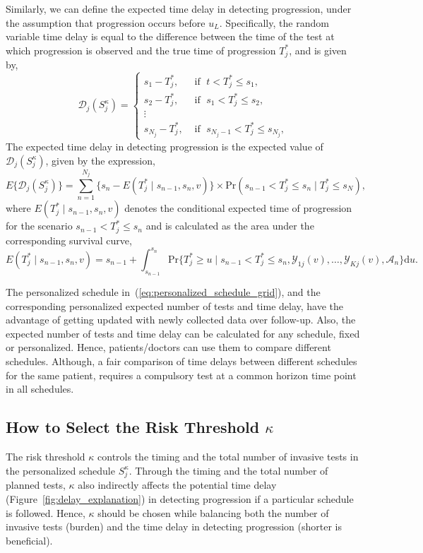 Similarly, we can define the expected time delay in detecting progression, under the assumption that progression occurs before $u_L$. Specifically, the random variable time delay is equal to the difference between the time of the test at which progression is observed and the true time of progression $T_j^*$, and is given by,
\[
\mathcal D_j (S^\kappa_j) = \left \{
\begin{array}{ll}
s_1 - T_j^*, & \mbox{ if } \; t < T^*_j \leq s_1,\\
s_2 - T_j^*, & \mbox{ if } \; s_1 < T^*_j \leq s_2,\\
\vdots&\\
s_{N_j} - T_j^*, & \mbox{ if } \; s_{N_j-1} < T^*_j \leq s_{N_j},
\end{array}
\right.
\]
The expected time delay in detecting progression is the expected value of $\mathcal D_j (S^\kappa_j)$, given by the expression,
\begin{equation*}
\label{eq:exp_delay}
E \big \{ \mathcal D_j(S^\kappa_j)\big\} = \sum_{n = 1}^{N_j} \Big\{s_n - E(T^*_j \mid s_{n-1}, s_n, v)\Big\} \times \mbox{Pr}(s_{n-1} < T^*_j \leq s_n\mid T^*_j \leq s_N),
\end{equation*}
where $E(T^*_j \mid s_{n-1}, s_n, v)$ denotes the conditional expected time of progression for the scenario $s_{n-1} < T^*_j \leq s_n$ and is calculated as the area under the corresponding survival curve,
\begin{equation*}
E(T^*_j \mid s_{n-1}, s_n, v) = s_{n-1} + \int_{s_{n-1}}^{s_n} \mbox{Pr}\Big\{T^*_j \geq u \mid s_{n-1} < T^*_j \leq s_n, \mathcal{Y}_{1j}(v), \ldots, \mathcal{Y}_{Kj}(v), \mathcal{A}_n\Big\} \mathrm{d}u.
\end{equation*}

The personalized schedule in~(\ref{eq:personalized_schedule_grid}), and the corresponding personalized expected number of tests and time delay, have the advantage of getting updated with newly collected data over follow-up. Also, the expected number of tests and time delay can be calculated for any schedule, fixed or personalized. Hence, patients/doctors can use them to compare different schedules. Although, a fair comparison of time delays between different schedules for the same patient, requires a compulsory test at a common horizon time point in all schedules.

\subsection{How to Select the Risk Threshold $\kappa$}
\label{subsec:kappa_selection}
The risk threshold $\kappa$ controls the timing and the total number of invasive tests in the personalized schedule $S^\kappa_j$. Through the timing and the total number of planned tests, $\kappa$ also indirectly affects the potential time delay (Figure~\ref{fig:delay_explanation}) in detecting progression if a particular schedule is followed. Hence, $\kappa$ should be chosen while balancing both the number of invasive tests (burden) and the time delay in detecting progression (shorter is beneficial).

